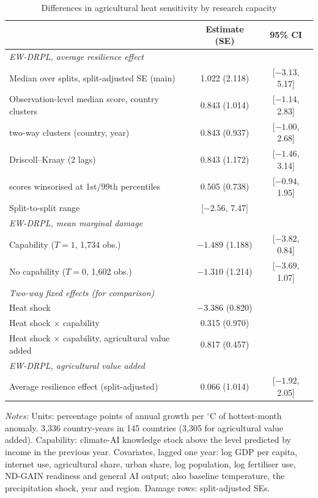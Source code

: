 \begin{table}[t]
\centering
\caption{Differences in agricultural heat sensitivity by research capacity}\label{tab:ate}
\small
\begin{tabular}{lcc}
\toprule
 & Estimate (SE) & 95\% CI \\
\midrule
\multicolumn{3}{l}{\emph{EW-DRPL, average resilience effect}}\\
Median over splits, split-adjusted SE (main) & 1.022 (2.118) & [$-3.13$, 5.17] \\
Observation-level median score, country clusters & 0.843 (1.014) & [$-1.14$, 2.83] \\
\quad two-way clusters (country, year) & 0.843 (0.937) & [$-1.00$, 2.68] \\
\quad Driscoll--Kraay (2 lags) & 0.843 (1.172) & [$-1.46$, 3.14] \\
\quad scores winsorised at 1st/99th percentiles & 0.505 (0.738) & [$-0.94$, 1.95] \\
Split-to-split range & [$-2.56$, 7.47] & \\
\midrule
\multicolumn{3}{l}{\emph{EW-DRPL, mean marginal damage}}\\
Capability ($T=1$, 1,734 obs.) & $-1.489$ (1.188) & [$-3.82$, 0.84] \\
No capability ($T=0$, 1,602 obs.) & $-1.310$ (1.214) & [$-3.69$, 1.07] \\
\midrule
\multicolumn{3}{l}{\emph{Two-way fixed effects (for comparison)}}\\
Heat shock & $-3.386$ (0.820) & \\
Heat shock $\times$ capability & 0.315 (0.970) & \\
Heat shock $\times$ capability, agricultural value added & 0.817 (0.457) & \\
\midrule
\multicolumn{3}{l}{\emph{EW-DRPL, agricultural value added}}\\
Average resilience effect (split-adjusted) & 0.066 (1.014) & [$-1.92$, 2.05] \\
\bottomrule
\end{tabular}
\begin{minipage}{0.95\textwidth}\footnotesize\smallskip
\emph{Notes:} Units: percentage points of annual growth per $^{\circ}$C of hottest-month anomaly.
3,336 country-years in 145 countries (3,305 for agricultural value added). Capability:
climate-AI knowledge stock above the level predicted by income in the previous year. Covariates,
lagged one year: log GDP per capita, internet use, agricultural share, urban share, log population,
log fertiliser use, ND-GAIN readiness and general AI output; also baseline temperature, the
precipitation shock, year and region. Damage rows: split-adjusted SEs.
\end{minipage}
\end{table}


